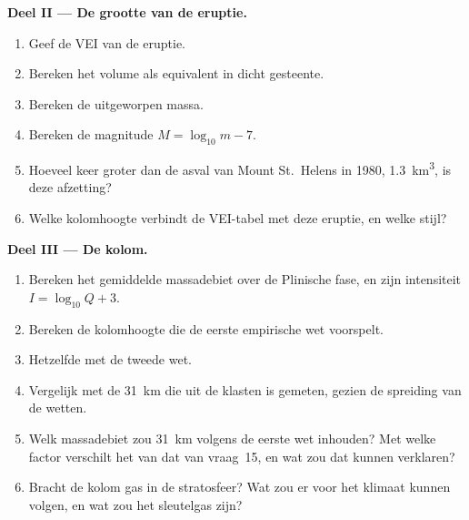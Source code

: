 \begin{problem}
\noindent\textbf{Deel II --- De grootte van de eruptie.}
\begin{enumerate}[resume]
\item Geef de VEI van de eruptie.
\item Bereken het volume als equivalent in dicht gesteente.
\item Bereken de uitgeworpen massa.
\item Bereken de magnitude $M = \log_{10}m - 7$.
\item Hoeveel keer groter dan de asval van Mount St.~Helens in 1980,
\qty{1.3}{km^3}, is deze afzetting?
\item Welke kolomhoogte verbindt de VEI-tabel met deze eruptie, en
welke stijl?
\end{enumerate}

\noindent\textbf{Deel III --- De kolom.}
\begin{enumerate}[resume]
\item Bereken het gemiddelde massadebiet over de Plinische fase, en zijn
intensiteit $I = \log_{10}Q + 3$.
\item Bereken de kolomhoogte die de eerste empirische wet voorspelt.
\item Hetzelfde met de tweede wet.
\item Vergelijk met de \qty{31}{km} die uit de klasten is gemeten, gezien de spreiding
van de wetten.
\item Welk massadebiet zou \qty{31}{km} volgens de eerste wet inhouden? Met welke
factor verschilt het van dat van vraag~15, en wat zou dat kunnen verklaren?
\item Bracht de kolom gas in de stratosfeer? Wat zou er voor het
klimaat kunnen volgen, en wat zou het sleutelgas zijn?
\end{enumerate}


\end{problem}
